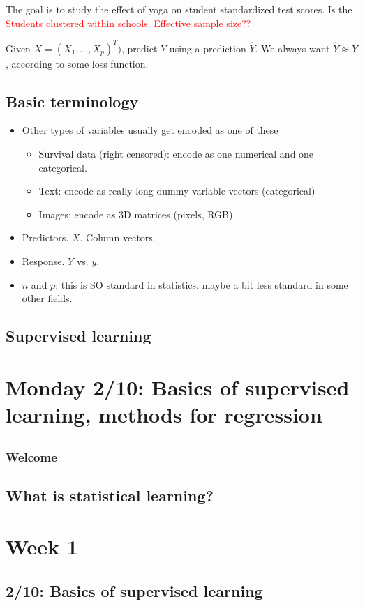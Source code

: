 \documentclass[titlepage,10pt]{scrartcl}
\begin{document}
The goal is to study the effect of yoga on student standardized test scores. Is the 
\textcolor{red}{Students clustered within schools. Effective sample size?? }





Given $X = (X_1, \ldots, X_p)^T)$, predict $Y$ using a prediction $\hat{Y}$. We always want $\hat{Y} \approx Y$, according to some loss function. 








\subsection{Basic terminology}
\begin{itemize}
\item Other types of variables usually get encoded as one of these
\begin{itemize}
\item Survival data (right censored): encode as one numerical and one categorical.
\item Text: encode as really long dummy-variable vectors (categorical)
\item Images: encode as 3D matrices (pixels, RGB). 
\end{itemize}
\item Predictors. $X$. Column vectors. 
\item Response. $Y$ vs. $y$.
\item $n$ and $p$: this is SO standard in statistics. maybe a bit less standard in some other fields. 
\end{itemize}


\subsection{Supervised learning}




\section*{Monday 2/10: Basics of supervised learning, methods for regression}

\subsection{}





\subsubsection{Welcome}


\subsection{What is statistical learning?}

\section*{Week 1}

\subsection*{2/10: Basics of supervised learning}
\end{document}

